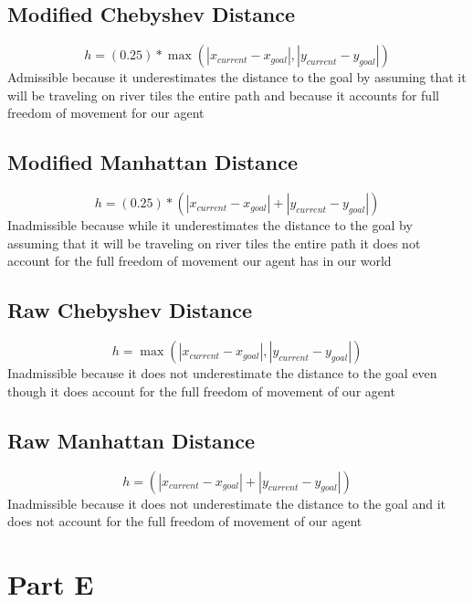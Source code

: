 \documentclass[12pt]{article}
\begin{document}
\subsection{Modified Chebyshev Distance}
  \[ h = (0.25) * \max( | x_{current} - x_{goal} |, | y_{current} - y_{goal} | )\]
\newline
Admissible because it underestimates the distance to the goal by assuming that it will be traveling on river tiles the entire path and because it accounts for full freedom of movement for our agent
\subsection{Modified Manhattan Distance}
\[ h = (0.25) * ( | x_{current} - x_{goal} | + | y_{current} - y_{goal} | )\]
\newline
Inadmissible because while it underestimates the distance to the goal by assuming that it will be traveling on river tiles the entire path it does not account for the full freedom of movement our agent has in our world
\subsection{Raw Chebyshev Distance}
 \[ h = \max( | x_{current} - x_{goal} |, | y_{current} - y_{goal} | )\]
\newline
Inadmissible because it does not underestimate the distance to the goal even though it does account for the full freedom of movement of our agent
\subsection{Raw Manhattan Distance}
\[ h =  ( | x_{current} - x_{goal} | + | y_{current} - y_{goal} | )\] 
Inadmissible because it does not underestimate the distance to the goal and it does not account for the full freedom of movement of our agent


\section{Part E}
\end{document}
